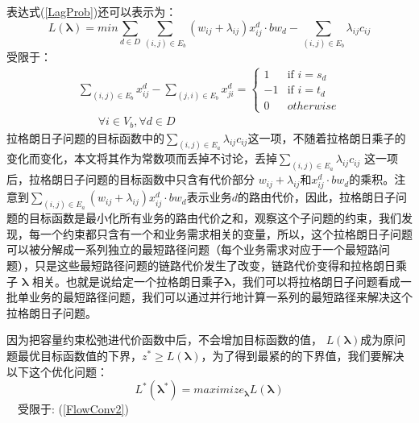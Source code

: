 表达式(\ref{LagProb})还可以表示为：
\begin{equation}\label{Lagprob1}
L(\mathbf{\lambda})= min\sum\limits_{d \in D}\sum\limits_{(i,j) \in E_b} (w_{ij}+\lambda_{ij})x_{ij}^d \cdot bw_d -\sum\limits_{(i,j) \in E_b}\lambda_{ij}c_{ij}
\end{equation}
受限于：
\begin{equation}\label{FlowConv2}
\begin{split}
\sum\limits_{(i,j) \in E_b} x_{ij}^d - \sum\limits_{(j,i) \in E_b} x_{ji}^d
=\begin{cases}
1 & \text{if $i = s_d$}\\
-1 & \text{if $i = t_d$} \\
0 &{otherwise}
\end{cases}
\\~~~~~~~~\forall i\in V_b, \forall d\in D
\end{split}
\end{equation}
拉格朗日子问题的目标函数中的$\sum_{(i,j) \in E_a}\lambda_{ij}c_{ij}$这一项，不随着拉格朗日乘子的变化而变化，本文将其作为常数项而丢掉不讨论，丢掉$\sum_{(i,j) \in E_a}\lambda_{ij}c_{ij}$ 这一项后，拉格朗日子问题的目标函数中只含有代价部分 $w_{ij}+\lambda_{ij}$和$x_{ij}^d\cdot bw_d$的乘积。注意到$\sum_{(i,j) \in E_a} (w_{ij}+\lambda_{ij})x_{ij}^d\cdot bw_d$表示业务$d$的路由代价，因此，拉格朗日子问题的目标函数是最小化所有业务的路由代价之和，观察这个子问题的约束，我们发现，每一个约束都只含有一个和业务需求相关的变量，所以，这个拉格朗日子问题可以被分解成一系列独立的最短路径问题（每个业务需求对应于一个最短路问题），只是这些最短路径问题的链路代价发生了改变，链路代价变得和拉格朗日乘子 $\mathbf{\lambda}$ 相关。也就是说给定一个拉格朗日乘子$\mathbf{\lambda}$，我们可以将拉格朗日子问题看成一批单业务的最短路径问题，我们可以通过并行地计算一系列的最短路径来解决这个拉格朗日子问题。

因为把容量约束松弛进代价函数中后，不会增加目标函数的值， $L(\mathbf{\lambda})$成为原问题最优目标函数值的下界，$z^* \ge L(\mathbf{\lambda})$，为了得到最紧的的下界值，我们要解决以下这个优化问题：
\begin{equation}\label{dual}
L^*(\mathbf{\lambda^*}) = maximize_{\mathbf{\lambda}}L(\mathbf{\lambda})
\end{equation}
~~受限于: (\ref{FlowConv2})
\vskip 0.2cm

